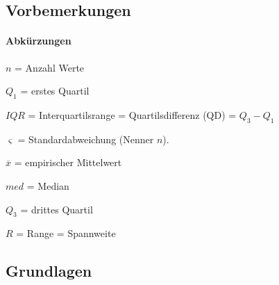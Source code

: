 \setcounter{aufgabenNummer}{1}
  \renewcommand{\kAufgabenBuchstabe}{D}




\subsection{Vorbemerkungen}
\paragraph{Abkürzungen}

$n$ = Anzahl Werte

$Q_1$ = erstes Quartil

$IQR$ = Interquartilsrange = Quartilsdifferenz (QD) = $Q_3 - Q_1$

$\varsigma$ = Standardabweichung (Nenner $n$).

$\overline{x}$ = empirischer Mittelwert

$med$ = Median

$Q_3$ = drittes Quartil

$R$ = Range = Spannweite

\subsection{Grundlagen}

